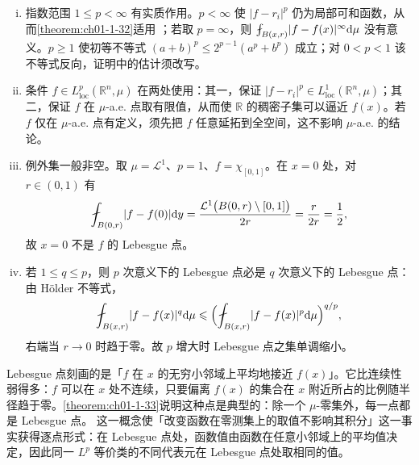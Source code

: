 \documentclass[../../main.tex]{subfiles}%
\begin{document}
\begin{remark}\label{remark:ch01-def-1-24-条件}
\begin{enumerate}[(i)]
\item 指数范围 $1\leqslant p<\infty$ 有实质作用。$p<\infty$ 使 $\lvert f-r_i\rvert^{p}$ 仍为局部可和函数，从而\cref{theorem:ch01-1-32}适用 ；若取 $p=\infty$，则 $\fint_{B(x,r)}\lvert f-f(x)\rvert^{\infty}\diff\mu$ 没有意义。$p\geqslant1$ 使初等不等式 $(a+b)^{p}\leqslant2^{p-1}(a^{p}+b^{p})$ 成立；对 $0<p<1$ 该不等式反向，证明中的估计须改写。 %
\item 条件 $f\in L^{p}_{\mathrm{loc}}(\mathbb{R}^n,\mu)$ 在两处使用：其一，保证 $\lvert f-r_i\rvert^{p}\in L^{1}_{\mathrm{loc}}(\mathbb{R}^n,\mu)$；其二，保证 $f$ 在 $\mu$-a.e. 点取有限值，从而使 $\mathbb{R}$ 的稠密子集可以逼近 $f(x)$。若 $f$ 仅在 $\mu$-a.e. 点有定义，须先把 $f$ 任意延拓到全空间，这不影响 $\mu$-a.e. 的结论。
\item 例外集一般非空。取 $\mu=\mathcal{L}^{1}$、$p=1$、$f=\chi_{[0,1]}$。在 $x=0$ 处，对 $r\in(0,1)$ 有
\begin{align*}
\fint_{B(0,r)}\lvert f-f(0)\rvert\diff y=\frac{\mathcal{L}^{1}\bigl(B(0,r)\setminus[0,1]\bigr)}{2r}=\frac{r}{2r}=\frac{1}{2},
\end{align*}
故 $x=0$ 不是 $f$ 的 Lebesgue 点。
\item 若 $1\leqslant q\leqslant p$，则 $p$ 次意义下的 Lebesgue 点必是 $q$ 次意义下的 Lebesgue 点：由 Hölder 不等式，
\begin{align*}
\fint_{B(x,r)}\lvert f-f(x)\rvert^{q}\diff\mu
\leqslant\Bigl(\fint_{B(x,r)}\lvert f-f(x)\rvert^{p}\diff\mu\Bigr)^{q/p},
\end{align*}
右端当 $r\to0$ 时趋于零。故 $p$ 增大时 Lebesgue 点之集单调缩小。
\end{enumerate}
\end{remark}

\begin{remark}\label{remark:ch01-def-1-24-b}
Lebesgue 点刻画的是「$f$ 在 $x$ 的无穷小邻域上平均地接近 $f(x)$」。它比连续性弱得多：$f$ 可以在 $x$ 处不连续，只要偏离 $f(x)$ 的集合在 $x$ 附近所占的比例随半径趋于零。\cref{theorem:ch01-1-33}说明这种点是典型的：除一个 $\mu$-零集外，每一点都是 Lebesgue 点。%
这一概念使「改变函数在零测集上的取值不影响其积分」这一事实获得逐点形式：在 Lebesgue 点处，函数值由函数在任意小邻域上的平均值决定，因此同一 $L^{p}$ 等价类的不同代表元在 Lebesgue 点处取相同的值。
\end{remark}
\end{document}
